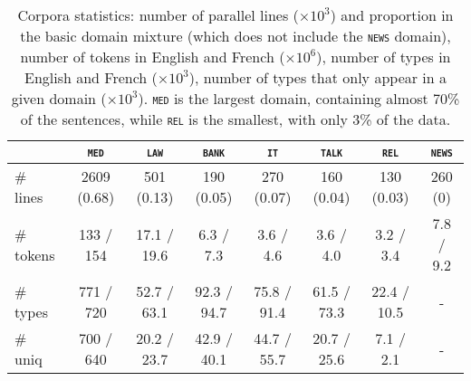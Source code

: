 \documentclass[11pt,a4paper]{article}
\newcommand{\revision}[1]{#1}
\newcommand{\domain}[1]{\texttt{\textsc{#1}}}
\begin{document}

\begin{table*}[htbp]
  \centering
  \begin{tabular}{|l|ccccccc|} %
    \cline{2-8} 
    \multicolumn{1}{c|}{} & \multicolumn{1}{c}{\domain{med}} & \multicolumn{1}{c}{\domain{law}} & \multicolumn{1}{c}{\domain{bank}} & \multicolumn{1}{c}{\domain{it}} & \multicolumn{1}{c}{\domain{talk}} & \multicolumn{1}{c}{\domain{rel}} & \multicolumn{1}{c|}{\domain{news}} \\
    \hline 
    \# lines & 2609 (0.68) & 501 (0.13) & 190 (0.05) & 270 (0.07) & 160 (0.04) & 130 (0.03) & 260 (0) \\
    \# \revision{tokens}  &  133 / 154  &  17.1 / 19.6 &  6.3 / 7.3 &  3.6 / 4.6 &  3.6 / 4.0 &  3.2 / 3.4 & 7.8 / 9.2   \\
    \# \revision{types}  & 771 / 720 & 52.7 / 63.1 & 92.3 / 94.7 & 75.8 / 91.4 & 61.5 / 73.3 & 22.4 / 10.5 & - \\
    \# \revision{uniq} & 700 / 640 & 20.2 / 23.7 & 42.9 / 40.1 & 44.7 / 55.7 & 20.7 / 25.6 & 7.1 / 2.1 & - \\
    \hline
  \end{tabular}
  \caption{Corpora statistics: number of parallel lines ($\times 10^3$) and proportion in the basic domain mixture (which does not include the \domain{news} domain), number of tokens in English and French ($\times 10^6$), number of types in English and French ($\times 10^3$), number of types that only appear in a given domain ($\times 10^3$). \domain{med} is the largest domain, containing almost 70\% of the sentences, while \domain{rel} is the smallest, with only 3\% of the data.
  }
\label{tab:Corpora}
\end{table*}
\end{document}
